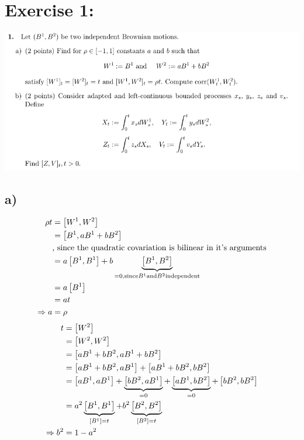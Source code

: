 \documentclass[document.tex]{subfiles}
\begin{document}
\section*{Exercise 1:}

\includegraphics[width=\textwidth]{ex1.png}

\subsection*{a)}
\begin{align*}
	\rho t &= \left[W^1 , W^2 \right] \\
	&= \left[B^1 , a B^1 + b B^2 \right] \\
	&\text{, since the quadratic covariation is bilinear in it's arguments}\\
	&= a \left[B^1 , B^1 \right] + b \underbrace{\left[B^1 , B^2 \right]}_{=0, \text{since} B^1 \text{and} B^2 \text{independent}} \\
	&= a \left[ B^1 \right] \\
	&= a t \\
\Rightarrow a &= \rho	 
\end{align*}
\begin{align*}
	t &= \left[ W^2 \right] \\
	&= \left[W^2 , W^2 \right]\\
	&= \left[a B^1 + b B^2 , a B^1 + b B^2 \right]\\
	&= \left[a B^1 + b B^2 , a B^1 \right] + \left[a B^1 + b B^2 , b B^2 \right]\\
	&= \left[aB^1 , aB^1 \right] + \underbrace{\left[bB^2 , aB^1 \right]}_{=0} + \underbrace{\left[aB^1 , bB^2 \right]}_{=0} + \left[bB^2 , bB^2 \right]\\
	&= a^2 \underbrace{\left[B^1 , B^1 \right]}_{\left[ B^1 \right]=t}+ b^2 \underbrace{\left[B^2 , B^2 \right]}_{\left[ B^2 \right]=t} \\
\Rightarrow	b^2 &= 1 - a^2
\end{align*}
\end{document}
